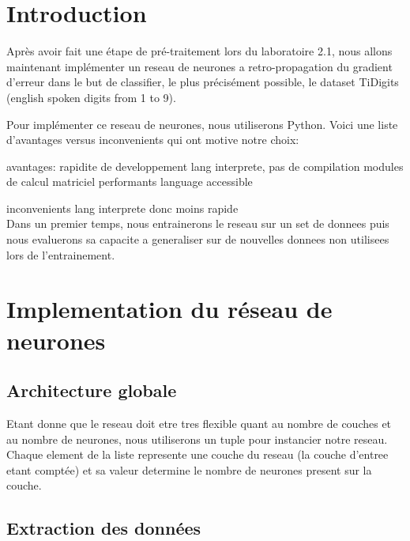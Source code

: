 \documentclass[11pt]{article}
\date{}
\begin{document}
\def \ETScourse {ELE778-01 - Intelligence artificielle: réseaux neuroniques
et systèmes experts}
\def \ETStitle {Laboratoire 2}
\def \ETSprof  {Cynthia \textsc{Moussa}}
\def \ETSauthA {Liam \textsc{Beguin}\\\emph{BEGL02129304}}
\def \ETSauthB {Louis \textsc{Laporte}\\\emph{LAPL14128903}}


\section{Introduction}
Après avoir fait une étape de pré-traitement lors du laboratoire 2.1, nous
allons maintenant implémenter un reseau de neurones a retro-propagation du
gradient d’erreur dans le but de classifier, le plus précisément possible,
le dataset TiDigits (english spoken digits from 1 to 9). 

Pour implémenter ce reseau de neurones, nous utiliserons Python. 
Voici une liste d'avantages versus inconvenients qui ont motive notre choix:
\item avantages:
	\subitem rapidite de developpement
	\subitem lang interprete, pas de compilation
	\subitem modules de calcul matriciel performants
	\subitem language accessible
\item{inconvenients}
	\subitem lang interprete donc moins rapide \\

Dans un premier temps, nous entrainerons le reseau sur un set de donnees puis
nous evaluerons sa capacite a generaliser sur de nouvelles donnees non utilisees
lors de l'entrainement. 

\section{Implementation du r\'eseau de neurones}
\subsection{Architecture globale}
Etant donne que le reseau doit etre tres flexible quant au nombre de couches
et au nombre de neurones, nous utiliserons un tuple pour instancier
notre reseau. Chaque element de la liste represente une couche du reseau
(la couche d'entree etant compt\'ee) et sa valeur determine le nombre de neurones
present sur la couche.

\subsection{Extraction des donn\'ees}
\end{document}
